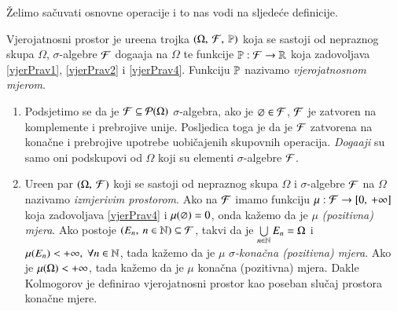 \v Zelimo sa\v cuvati osnovne operacije i to nas vodi na sljede\' ce
definicije.

\begin{defn}
    Vjerojatnosni prostor je ure\dj ena trojka
    $(\Omega, \: \mathcal{F}, \: \mathbb{P})$ koja se sastoji od nepraznog skupa
    $\Omega$, $\sigma$-algebre $\mathcal{F}$ doga\dj aja na $\Omega$ te
    funkcije $\mathbb{P}: \mathcal{F} \to \mathbb{R}$ koja zadovoljava \eqref{vjerPrav1},
    \eqref{vjerPrav2} i \eqref{vjerPrav4}.
    Funkciju $\mathbb{P}$ nazivamo \emph{vjerojatnosnom mjerom}.
\end{defn}

\begin{nap}
    \begin{enumerate}[label=(\alph*)]
        \item Podsjetimo se da je $\mathcal{F} \subseteq \mathcal{P}({\Omega})$
            $\sigma$-algebra, ako je $\varnothing \in \mathcal{F}$, $\mathcal{F}$ je
            zatvoren na komplemente i prebrojive unije. Posljedica
            toga je da je $\mathcal{F}$ zatvorena na kona\v cne i prebrojive
            upotrebe uobi\v cajenih skupovnih operacija.
            \emph{Doga\dj aji}  su samo oni podskupovi od $\Omega$
            koji su elementi $\sigma$-algebre $\mathcal{F}$.
        \item Ure\dj en par $(\Omega, \: \mathcal{F})$ koji se sastoji od
            nepraznog skupa $\Omega$ i $\sigma$-algebre $\mathcal{F}$ na
            $\Omega$ nazivamo \emph{izmjerivim prostorom}.
            Ako na $\mathcal{F}$ imamo funkciju $\mu : \mathcal{F} \to
            [{0}, \:{+ \infty}]$ koja zadovoljava \eqref{vjerPrav4}
            i $\mu({\varnothing}) = 0$, onda ka\v zemo da je $\mu$
            \emph{(pozitivna) mjera}.
            Ako postoje $(E_n, \: n \in \mathbb{N}) \subseteq \mathcal{F}$, takvi da
            je $\bigcup\limits_{n \in \mathbb{N}}^{} E_n = \Omega$ i $\mu({E_n}) <
            +\infty, \; \forall n \in \mathbb{N}$, tada ka\v zemo da je $\mu$
            \emph{$\sigma$-kona\v cna (pozitivna) mjera}.
            Ako je $\mu({\Omega}) < +\infty$, tada ka\v zemo da je
            $\mu$ kona\v cna (pozitivna) mjera.
            Dakle Kolmogorov je definirao vjerojatnosni prostor kao
            poseban slu\v caj prostora kona\v cne mjere.
    \end{enumerate}
\end{nap}